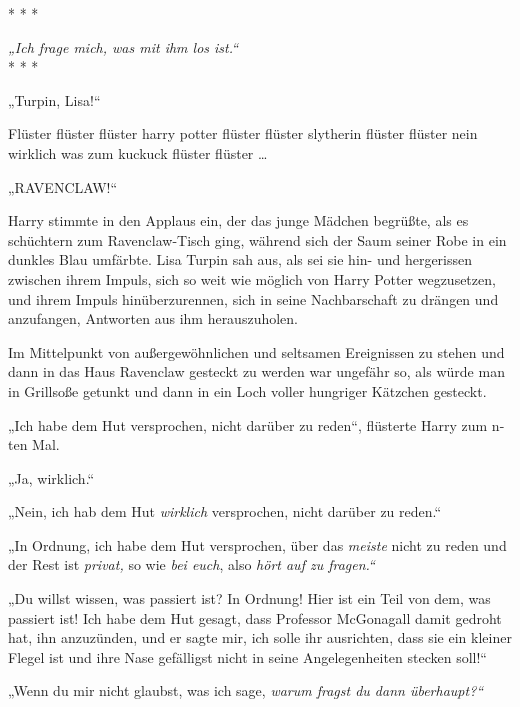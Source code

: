 

\hypertarget{selbstbeherrschung}{%

* * *

\hfill\break \emph{„Ich frage mich, was mit ihm los ist.“}\\

* * *

„Turpin, Lisa!“

Flüster flüster flüster harry potter flüster flüster slytherin flüster flüster nein wirklich was zum kuckuck flüster flüster …

„RAVENCLAW!“

Harry stimmte in den Applaus ein, der das junge Mädchen begrüßte, als es schüchtern zum Ravenclaw-Tisch ging, während sich der Saum seiner Robe in ein dunkles Blau umfärbte. Lisa Turpin sah aus, als sei sie hin- und hergerissen zwischen ihrem Impuls, sich so weit wie möglich von Harry Potter wegzusetzen, und ihrem Impuls hinüberzurennen, sich in seine Nachbarschaft zu drängen und anzufangen, Antworten aus ihm herauszuholen.

Im Mittelpunkt von außergewöhnlichen und seltsamen Ereignissen zu stehen und dann in das Haus Ravenclaw gesteckt zu werden war ungefähr so, als würde man in Grillsoße getunkt und dann in ein Loch voller hungriger Kätzchen gesteckt.

„Ich habe dem Hut versprochen, nicht darüber zu reden“, flüsterte Harry zum n-ten Mal.

„Ja, wirklich.“

„Nein, ich hab dem Hut \emph{wirklich} versprochen, nicht darüber zu reden.“

„In Ordnung, ich habe dem Hut versprochen, über das \emph{meiste} nicht zu reden und der Rest ist \emph{privat,} so wie \emph{bei euch}, also \emph{hört auf zu fragen.“}

„Du willst wissen, was passiert ist? In Ordnung! Hier ist ein Teil von dem, was passiert ist! Ich habe dem Hut gesagt, dass Professor McGonagall damit gedroht hat, ihn anzuzünden, und er sagte mir, ich solle ihr ausrichten, dass sie ein kleiner Flegel ist und ihre Nase gefälligst nicht in seine Angelegenheiten stecken soll!“

„Wenn du mir nicht glaubst, was ich sage, \emph{warum fragst du dann überhaupt?“}

}
